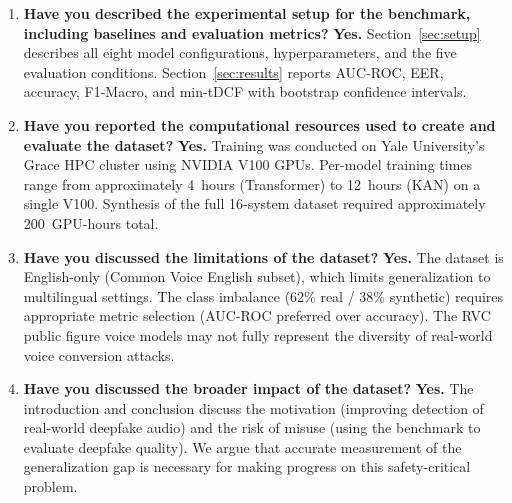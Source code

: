 \documentclass{article}
\begin{document}
\begin{enumerate}
  \item \textbf{Have you described the experimental setup for the
    benchmark, including baselines and evaluation metrics?}
    \textbf{Yes.}  Section~\ref{sec:setup} describes all eight model configurations,
    hyperparameters, and the five evaluation conditions.
    Section~\ref{sec:results} reports AUC-ROC, EER, accuracy, F1-Macro,
    and min-tDCF with bootstrap confidence intervals.

  \item \textbf{Have you reported the computational resources used to
    create and evaluate the dataset?}
    \textbf{Yes.}  Training was conducted on Yale University's
    Grace HPC cluster using NVIDIA V100 GPUs.  Per-model training
    times range from approximately 4~hours (Transformer) to 12~hours
    (KAN) on a single V100.  Synthesis of the full 16-system dataset
    required approximately 200~GPU-hours total.

  \item \textbf{Have you discussed the limitations of the dataset?}
    \textbf{Yes.}  The dataset is English-only (Common Voice English
    subset), which limits generalization to multilingual settings.
    The class imbalance (62\% real / 38\% synthetic) requires
    appropriate metric selection (AUC-ROC preferred over accuracy).
    The RVC public figure voice models may not fully represent the diversity
    of real-world voice conversion attacks.

  \item \textbf{Have you discussed the broader impact of the dataset?}
    \textbf{Yes.}  The introduction and conclusion discuss the motivation
    (improving detection of real-world deepfake audio) and the risk of
    misuse (using the benchmark to evaluate deepfake quality).  We argue
    that accurate measurement of the generalization gap is necessary for
    making progress on this safety-critical problem.

\end{enumerate}
\end{document}
